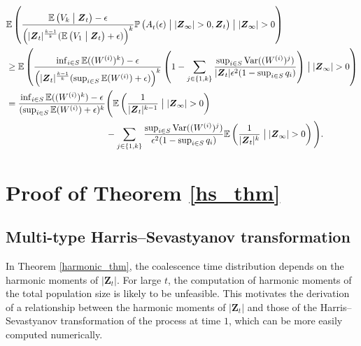 \documentclass[preprint,3p,12pt]{elsarticle}
\theoremstyle{definition}
\newcommand{\Var}{\operatorname{Var}}
\newcommand{\A}[1][]{A_t^{#1}(\epsilon)}
\newcommand{\V}[1]{V_{#1}}
\begin{document}
    \begin{align*}
    &\mathbb{E}\left(\frac{\mathbb{E}\left(\V{k}\bigm|  \boldsymbol{Z}_t\right)-\epsilon}
    {\left(|\boldsymbol{Z}_t|^{\frac{k-1}{k}}(\mathbb{E}\left(\V{1}\bigm|  \boldsymbol{Z}_t\right)+\epsilon)\right)^k}\mathbb{P}\left(\A\bigm| |\boldsymbol{Z}_{\infty}| > 0,\boldsymbol{Z}_t  \right)\bigm| |\boldsymbol{Z}_{\infty}| > 0\right) \\
    &\ge \mathbb{E}\left(\frac{\inf_{i \in S}\mathbb{E}((W^{(i)})^k)-\epsilon}
    {\left(|\boldsymbol{Z}_t|^{\frac{k-1}{k}}(\sup_{i \in S}\mathbb{E}(W^{(i)})+\epsilon)\right)^k}\left(1 -  \sum_{j \in \{1,k\}}\frac{\sup_{i \in S}{\Var((W^{(i)})^j)}}{|\boldsymbol{Z}_t| \epsilon^2(1 - \sup_{i \in S}q_i)}\right)\bigm| |\boldsymbol{Z}_{\infty}| > 0\right) \\
    &= \frac{\inf_{i \in S}\mathbb{E}((W^{(i)})^k)-\epsilon}{(\sup_{i \in S}\mathbb{E}(W^{(i)})+\epsilon)^k}\Bigg(\mathbb{E}\left(\frac{1}
    {|\boldsymbol{Z}_t|^{k-1}} \bigm| |\boldsymbol{Z}_{\infty}| > 0\right) \\
    & \phantom{{}= \frac{\inf_{i \in S}\mathbb{E}((W^{(i)})^k)-\epsilon}{(\sup_{i \in S}\mathbb{E}(W^{(i)})+\epsilon)^k}} {}-  \sum_{j \in \{1,k\}}\frac{\sup_{i \in S}{\Var((W^{(i)})^j)}}{ \epsilon^2(1 - \sup_{i \in S}q_i)}\mathbb{E}\left(\frac{1}{|\boldsymbol{Z}_t|^k}\bigm| |\boldsymbol{Z}_{\infty}| > 0\right)\Bigg).
\end{align*}
\section{Proof of Theorem \ref{hs_thm}} \label{hs_section}
\subsection{Multi-type Harris--Sevastyanov transformation}
In Theorem \ref{harmonic_thm}, the coalescence time distribution depends on the harmonic moments of $|\boldsymbol{Z}_t|$. For large $t$, the computation of harmonic moments of the total population size is likely to be unfeasible. This motivates the derivation of a relationship between the harmonic moments of $|\boldsymbol{Z}_t|$ and those of the Harris--Sevastyanov transformation of the process at time $1$, which can be more easily computed numerically. 
\end{document}
